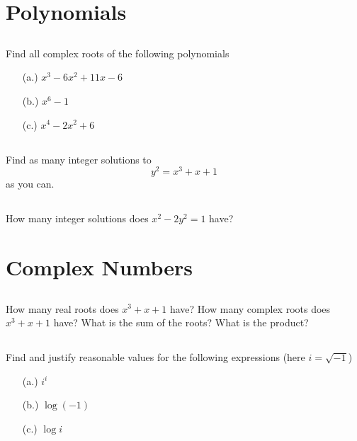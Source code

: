 \documentclass{article}
\theoremstyle{definition}
\begin{document}
\section{Polynomials}

\subsection{}

Find all complex roots of the following polynomials

\begin{enumerate}
\item[(a.)] $x^3 - 6 x^2 + 11 x - 6$

\item[(b.)] $x^6 - 1$

\item[(c.)] $x^4 - 2 x^2 + 6$
\end{enumerate}

\subsection{}

Find as many integer solutions to 
\[ y^2 = x^3 + x + 1 \]
as you can.

\subsection{}

How many integer solutions does $x^2 - 2 y^2 = 1$ have?


\section{Complex Numbers}

\subsection{}

How many real roots does $x^3 + x + 1$ have? How many complex roots does $x^3 + x + 1$ have? What is the sum of the roots? What is the product?

\subsection{}

Find and justify reasonable values for the following expressions (here $i = \sqrt{-1}$)

\begin{enumerate}
\item[(a.)] $i^i$

\item[(b.)] $\log{(-1)}$

\item[(c.)] $\log{i}$
\end{enumerate}
\end{document}
